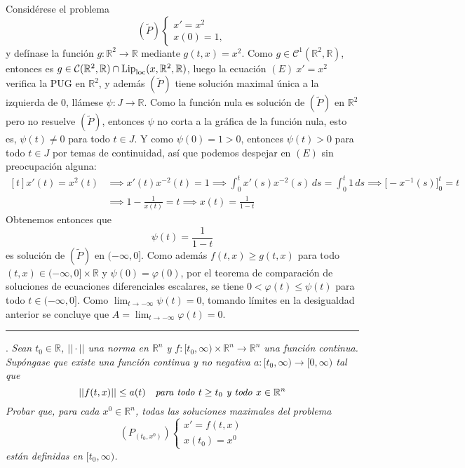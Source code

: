 \documentclass[11pt]{report}
\newcommand{\R}{\mathbb R}
\begin{document}
\begin{itemize}
    \vspace{2mm}

    Considérese el problema
    \[(\tilde{P}) \begin{cases}
        x'=x^2 \\
        x(0)=1,
    \end{cases}\]
    y defínase la función $g \colon \R^2 \to \R$ mediante $g(t,x) = x^2$. Como $g \in \mathcal{C}^1(\R^2,\R)$, entonces es $g \in \mathcal{C}(\R^2,\R) \cap \textup{Lip}_{\textup{loc}}(x,\R^2,\R)$, luego la ecuación $(E) \ x'=x^2$ verifica la PUG en $\R^2$, y además $(\tilde{P})$ tiene solución maximal única a la izquierda de 0, llámese $\psi \colon J \to \R$. Como la función nula es solución de $(\tilde{P})$ en $\R^2$ pero no resuelve $(\tilde{P})$, entonces $\psi$ no corta a la gráfica de la función nula, esto es, $\psi(t) \neq 0$ para todo $t \in J$. Y como $\psi(0)=1>0$, entonces $\psi(t) >0$ para todo $t \in J$ por temas de continuidad, así que podemos despejar en $(E)$ sin preocupación alguna:
    \[
    \begin{aligned}[t]
    x'(t)=x^2(t) &\implies x'(t)x^{-2}(t)=1 \implies \int_0^tx'(s)x^{-2}(s) \, ds = \int_0^t 1 \, ds \implies \bigl[ -x^{-1}(s)\bigr]_0^t = t \\
    &\implies 1-\frac{1}{x(t)} = t \implies x(t) = \frac{1}{1-t}
    \end{aligned}
    \]
    Obtenemos entonces que
    \[\psi(t)=\frac{1}{1-t}\]
    es solución de $(\tilde{P})$ en $(-\infty,0]$. Como además $f(t,x) \geq g(t,x)$ para todo $(t,x) \in (-\infty,0] \times \R$ y $\psi(0)=\varphi(0)$, por el teorema de comparación de soluciones de ecuaciones diferenciales escalares, se tiene $0 < \varphi(t) \leq \psi(t)$ para todo $t \in (-\infty,0]$. Como $\lim_{t \to -\infty} \psi(t) =0$, tomando límites en la desigualdad anterior se concluye que $A = \lim_{t \to -\infty} \varphi(t) = 0$.
    \end{itemize}

\vspace{2mm}

\hrule

\vspace{4mm}

. \textit{Sean $t_0 \in \R$, $|| \cdot ||$ una norma en $\R^n$ y $f \colon [t_0,\infty) \times \R^n \to\R^n$ una función continua. Supóngase que existe una función continua y no negativa $a \colon [t_0,\infty) \to [0,\infty)$ tal que}
\[||f(t,x)|| \leq a(t) \quad \textup{\textit{para todo }} t \geq t_0 \textup{\textit{ y todo }} x \in \R^n\]
\textit{Probar que, para cada $x^0 \in \R^n$, todas las soluciones maximales del problema}
\[(P_{(t_0,x^0)}) \begin{cases}
    x'=f(t,x) \\
    x(t_0)=x^0
\end{cases}\]
\textit{están definidas en $[t_0,\infty)$.}
\end{document}
